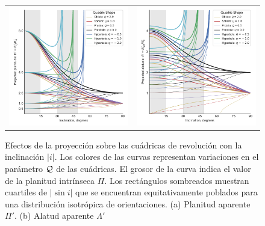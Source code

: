 \begin{figure}
  \begin{tabular}{lr}
    \includegraphics[width=0.5\linewidth]{./Figures/projected-Rc-vs-i} &
    \includegraphics[width=0.5\linewidth]{./Figures/projected-R90-vs-i}
  \end{tabular}
  \caption{Efectos de la proyección sobre las cuádricas de revolución con la inclinación $|i|$. Los colores de las curvas representan variaciones en el parámetro $\mathcal{Q}$ de las cuádricas. El grosor de la curva indica el valor de la planitud intrínseca $\Pi$. Los rectángulos sombreados muestran cuartiles de $|\sin i|$ que se encuentran equitativamente poblados para una distribución isotrópica de orientaciones. (a) Planitud aparente $\Pi'$. (b) Alatud aparente $\Lambda'$}
  \label{fig:proj-L-P-vs-i}
\end{figure}

